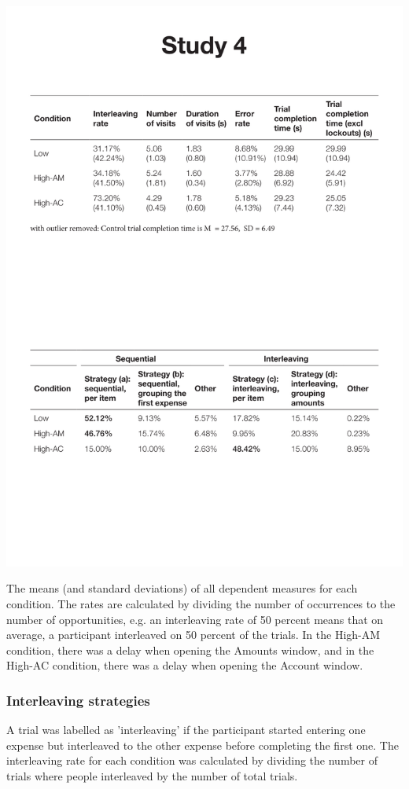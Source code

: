 \begin{table}
 \includegraphics[width=\textwidth]{images/ch34/ch34-4_means.pdf}
\caption[Study 4 means and SDs of dependent measures]{The means (and standard deviations) of all dependent measures for each condition. The rates are calculated by dividing the number of occurrences to the number of opportunities, e.g. an interleaving rate of 50 percent means that on average, a participant interleaved on 50 percent of the trials. In the High-AM condition, there was a delay when opening the Amounts window, and in the High-AC condition, there was a delay when opening the Account window.}
\label{tbl:ch34_4-means}
\end{table}

\subsubsection{Interleaving strategies}
A trial was labelled as 'interleaving' if the participant started entering one expense but interleaved to the other expense before completing the first one. The interleaving rate for each condition was calculated by dividing the number of trials where people interleaved by the number of total trials.  

